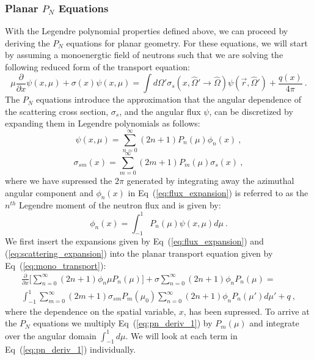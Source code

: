 \documentclass[letterpaper,12pt]{article}
\begin{document}
\subsubsection{Planar $P_N$ Equations}
\label{subsubsec:planar_pn}
With the Legendre polynomial properties defined above, we can proceed
by deriving the $P_N$ equations for planar geometry. For these
equations, we will start by assuming a monoenergtic field of neutrons
such that we are solving the following reduced form of the transport
equation: 
\begin{equation}
  \mu \frac{\partial}{\partial x} \psi(x,\mu) + \sigma(x) \psi(x,\mu)
  = \int d\Omega' \sigma_s(x,\hat{\Omega}' \rightarrow \hat{\Omega})
  \psi(\vec{r},\hat{\Omega}') + \frac{q(x)}{4 \pi}\:.
  \label{eq:mono_transport}
\end{equation}
The $P_N$ equations introduce the approximation that the angular
dependence of the scattering cross section, $\sigma_s$, and the angular
flux $\psi$, can be discretized by expanding them in Legendre
polynomials as follows:
\begin{equation}
  \psi(x,\mu) = \sum_{n=0}^\infty (2n+1)P_n(\mu)\phi_n(x)\:,
  \label{eq:flux_expansion}
\end{equation}
\begin{equation}
  \sigma_{sm}(x) = \sum_{m=0}^\infty (2m+1)P_m(\mu)\sigma_s(x)\:,
  \label{eq:scattering_expansion}
\end{equation}
where we have supressed the $2\pi$ generated by integrating away the
azimuthal angular component and $\phi_n(x)$ in
Eq~(\ref{eq:flux_expansion}) is referred to as the $n^{th}$ Legendre
moment of the neutron flux and is given by:
\begin{equation}
  \phi_n(x) = \int_{-1}^1 P_n(\mu)\psi(x,\mu)d\mu\:.
  \label{eq:legendre_moments}
\end{equation}
We first insert the expansions given by Eq~(\ref{eq:flux_expansion})
and (\ref{eq:scattering_expansion}) into the planar transport equation
given by Eq~(\ref{eq:mono_transport}):
\begin{multline}
  \frac{\partial}{\partial x}\Big[\sum_{n=0}^\infty (2n+1) \phi_n \mu
    P_n(\mu) \Big] + \sigma \sum_{n=0}^\infty (2n+1) \phi_n P_n(\mu) =
  \\ \int_{-1}^1 \sum_{m=0}^\infty (2m+1) \sigma_{sm} P_m(\mu_0)
  \sum_{n=0}^\infty (2n+1) \phi_n P_n(\mu') d \mu' + q\:,
  \label{eq:pn_deriv_1}
\end{multline}
where the dependence on the spatial variable, $x$, has been
supressed. To arrive at the $P_N$ equations we multiply
Eq~(\ref{eq:pn_deriv_1}) by $P_m(\mu)$ and integrate over the angular
domain $\int_{-1}^1 d \mu$. We will look at each term in
Eq~(\ref{eq:pn_deriv_1}) individually.
\end{document}
